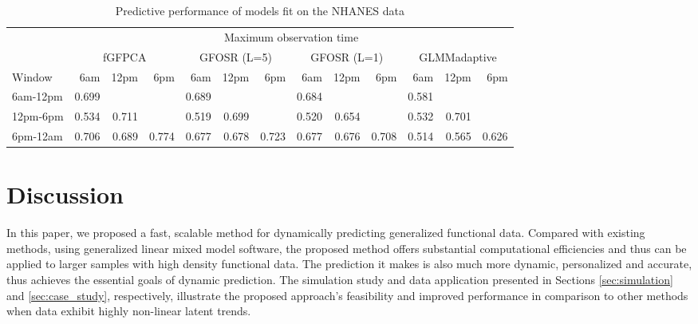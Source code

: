 \documentclass[12pt]{article}
\begin{document}
\begin{table}
\small
\centering
\begin{tabular}{lrrrrrrrrrrrr}
\toprule
\multicolumn{1}{c}{ } & \multicolumn{12}{c}{Maximum observation time} \\
\cmidrule(l{3pt}r{3pt}){2-13}
\multicolumn{1}{c}{ } & \multicolumn{3}{c}{fGFPCA} & \multicolumn{3}{c}{GFOSR (L=5)} & \multicolumn{3}{c}{GFOSR (L=1)} & \multicolumn{3}{c}{GLMMadaptive} \\
\cmidrule(l{3pt}r{3pt}){2-4} \cmidrule(l{3pt}r{3pt}){5-7} \cmidrule(l{3pt}r{3pt}){8-10} \cmidrule(l{3pt}r{3pt}){11-13}
Window & 6am & 12pm & 6pm & 6am & 12pm & 6pm & 6am & 12pm & 6pm & 6am & 12pm & 6pm\\
\midrule
6am-12pm & 0.699 &  &  & 0.689 &  &  & 0.684 &  &  & 0.581 &  & \\
12pm-6pm & 0.534 & 0.711 &  & 0.519 & 0.699 &  & 0.520 & 0.654 &  & 0.532 & 0.701 & \\
6pm-12am & 0.706 & 0.689 & 0.774 & 0.677 & 0.678 & 0.723 & 0.677 & 0.676 & 0.708 & 0.514 & 0.565 & 0.626\\
\bottomrule
\end{tabular}
\caption{Predictive performance of models fit on the NHANES data}
\label{tab:appl}
\end{table}


\section{Discussion}
\label{sec:discussion}

In this paper, we proposed a fast, scalable method for dynamically predicting generalized functional data. Compared with existing methods, using generalized linear mixed model software, the proposed method offers substantial computational efficiencies and thus can be applied to larger samples with high density functional data. The prediction it makes is also much more dynamic, personalized and accurate, thus achieves the essential goals of dynamic prediction. The simulation study and data application presented in Sections \ref{sec:simulation} and \ref{sec:case_study}, respectively, illustrate the proposed approach's feasibility and improved performance in comparison to other methods when data exhibit highly non-linear latent trends. 
\end{document}
